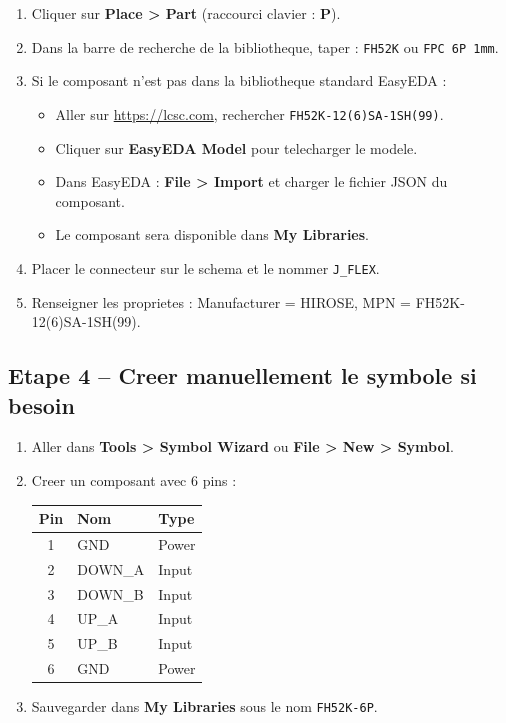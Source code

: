 \documentclass[12pt,a4paper]{article}
\begin{document}
\begin{enumerate}
  \item Cliquer sur \textbf{Place > Part} (raccourci clavier : \textbf{P}).
  \item Dans la barre de recherche de la bibliotheque, taper :
        \texttt{FH52K} ou \texttt{FPC 6P 1mm}.
  \item Si le composant n'est pas dans la bibliotheque standard EasyEDA :
    \begin{itemize}
      \item Aller sur \url{https://lcsc.com}, rechercher \texttt{FH52K-12(6)SA-1SH(99)}.
      \item Cliquer sur \textbf{EasyEDA Model} pour telecharger le modele.
      \item Dans EasyEDA : \textbf{File > Import} et charger le fichier JSON du composant.
      \item Le composant sera disponible dans \textbf{My Libraries}.
    \end{itemize}
  \item Placer le connecteur sur le schema et le nommer \texttt{J\_FLEX}.
  \item Renseigner les proprietes : Manufacturer = HIROSE, MPN = FH52K-12(6)SA-1SH(99).
\end{enumerate}

\subsection{Etape 4 -- Creer manuellement le symbole si besoin}

\begin{enumerate}
  \item Aller dans \textbf{Tools > Symbol Wizard} ou \textbf{File > New > Symbol}.
  \item Creer un composant avec 6 pins :
    \begin{center}
    \begin{tabular}{cll}
    \toprule
    Pin & Nom    & Type  \\
    \midrule
    1   & GND    & Power \\
    2   & DOWN\_A & Input \\
    3   & DOWN\_B & Input \\
    4   & UP\_A   & Input \\
    5   & UP\_B   & Input \\
    6   & GND    & Power \\
    \bottomrule
    \end{tabular}
    \end{center}
  \item Sauvegarder dans \textbf{My Libraries} sous le nom \texttt{FH52K-6P}.
\end{enumerate}
\end{document}
